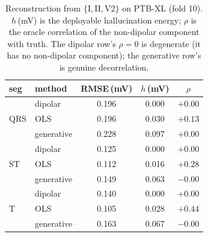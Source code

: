 \begin{table}[t]
\centering
\caption{Reconstruction from $\{$I,\,II,\,V2$\}$ on PTB-XL (fold 10). $h$\,(mV) is the
deployable hallucination energy; $\rho$ is the oracle correlation of the non-dipolar
component with truth. The dipolar row's $\rho{=}0$ is degenerate (it has no non-dipolar
component); the generative row's is genuine decorrelation.}
\label{tab:hall}
\small
\begin{tabular}{llccc}
\toprule
seg & method & RMSE\,(mV) & $h$\,(mV) & $\rho$ \\
\midrule
\multirow{3}{*}{QRS}
 & dipolar     & 0.196 & 0.000 & $+0.00$ \\
 & OLS         & 0.196 & 0.030 & $+0.13$ \\
 & generative  & 0.228 & 0.097 & $+0.00$ \\
\midrule
\multirow{3}{*}{ST}
 & dipolar     & 0.125 & 0.000 & $+0.00$ \\
 & OLS         & 0.112 & 0.016 & $+0.28$ \\
 & generative  & 0.149 & 0.063 & $-0.00$ \\
\midrule
\multirow{3}{*}{T}
 & dipolar     & 0.140 & 0.000 & $+0.00$ \\
 & OLS         & 0.105 & 0.028 & $+0.44$ \\
 & generative  & 0.163 & 0.067 & $-0.00$ \\
\bottomrule
\end{tabular}
\end{table}



